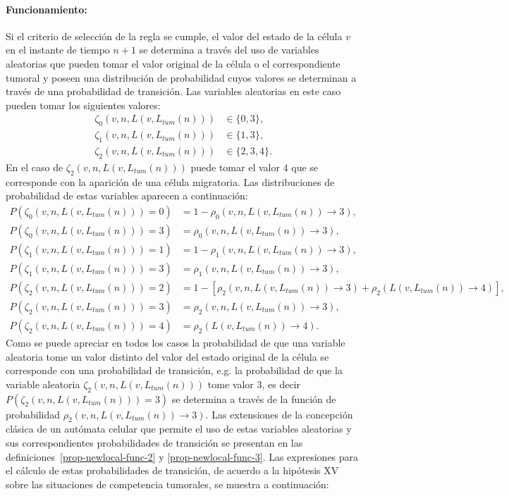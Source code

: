\paragraph*{{Funcionamiento}:} Si el criterio de selecci\'on de la regla se cumple, el valor del estado de la c\'elula $v$ en el instante de tiempo $n+1$ se determina a trav\'es del uso de variables aleatorias que pueden tomar el valor original de la c\'elula o el correspondiente tumoral y poseen una distribuci\'on de probabilidad cuyos valores se determinan a trav\'es de una probabilidad de transici\'on. Las variables aleatorias en este caso pueden tomar los siguientes valores:
\begin{align*}
\zeta_0(v,n,L(v,L_{tum}(n))) &\in \lbrace 0,3 \rbrace, \\
\zeta_1(v,n,L(v,L_{tum}(n))) &\in \lbrace 1,3 \rbrace, \\
\zeta_2(v,n,L(v,L_{tum}(n))) &\in \lbrace 2,3,4 \rbrace.
\end{align*}
En el caso de $\zeta_2(v,n,L(v,L_{tum}(n)))$ puede tomar el valor $4$ que se corresponde con la aparici\'on de una c\'elula migratoria. Las distribuciones de probabilidad de estas variables aparecen a continuaci\'on: 
\begin{align*}
P(\zeta_0(v,n,L(v,L_{tum}(n)))=0) &= 1 - \rho_0(v,n,L(v,L_{tum}(n)) \rightarrow 3), \\
P(\zeta_0(v,n,L(v,L_{tum}(n)))=3) &= \rho_0(v,n,L(v,L_{tum}(n)) \rightarrow 3), \\
P(\zeta_1(v,n,L(v,L_{tum}(n)))=1) &= 1 - \rho_1(v,n,L(v,L_{tum}(n)) \rightarrow 3), \\
P(\zeta_1(v,n,L(v,L_{tum}(n)))=3) &= \rho_1(v,n,L(v,L_{tum}(n)) \rightarrow 3), \\
P(\zeta_2(v,n,L(v,L_{tum}(n)))=2) &= 1 - \left[\rho_2(v,n,L(v,L_{tum}(n)) \rightarrow 3) + \rho_2(L(v,L_{tum}(n)) \rightarrow 4)\right], \\
P(\zeta_2(v,n,L(v,L_{tum}(n)))=3) &= \rho_2(v,n,L(v,L_{tum}(n)) \rightarrow 3), \\
P(\zeta_2(v,n,L(v,L_{tum}(n)))=4) &= \rho_2(L(v,L_{tum}(n)) \rightarrow 4).
\end{align*}
Como se puede apreciar en todos los casos la probabilidad de que una variable aleatoria tome un valor distinto del valor del estado original de la c\'elula se corresponde con una probabilidad de transici\'on, e.g. la probabilidad de que la variable aleatoria $\zeta_2(v,n,L(v,L_{tum}(n)))$ tome valor $3$, es decir $P(\zeta_2(v,n,L(v,L_{tum}(n)))=3)$ se determina a trav\'es de la funci\'on de probabilidad $\rho_2(v,n,L(v,L_{tum}(n)) \rightarrow 3)$. Las extensiones de la concepci\'on cl\'asica de un aut\'omata celular que permite el uso de estas variables aleatorias y sus correspondientes probabilidades de transici\'on se presentan en las definiciones~\ref{prop-newlocal-func-2} y \ref{prop-newlocal-func-3}. Las expresiones para el c\'alculo de estas probabilidades de transici\'on, de acuerdo a la hip\'otesis XV sobre las situaciones de competencia tumorales, se muestra a continuaci\'on:
